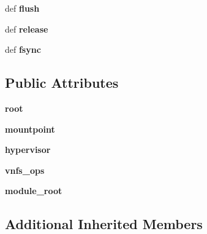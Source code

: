 \begin{DoxyCompactItemize}
\item 
\hypertarget{classnfio_1_1Nfio_a11131bfcad8345d6caac6e8a0e9edf8e}{def {\bfseries flush}}\label{classnfio_1_1Nfio_a11131bfcad8345d6caac6e8a0e9edf8e}

\item 
\hypertarget{classnfio_1_1Nfio_aa8899667347dbe1c3176f25fa29a9621}{def {\bfseries release}}\label{classnfio_1_1Nfio_aa8899667347dbe1c3176f25fa29a9621}

\item 
\hypertarget{classnfio_1_1Nfio_a9839b74eb4091fcfaf5a7d35ad20ec25}{def {\bfseries fsync}}\label{classnfio_1_1Nfio_a9839b74eb4091fcfaf5a7d35ad20ec25}

\end{DoxyCompactItemize}
\subsection*{Public Attributes}
\begin{DoxyCompactItemize}
\item 
\hypertarget{classnfio_1_1Nfio_aaebb8f6c5190c41a25e5415c56a5e6dd}{{\bfseries root}}\label{classnfio_1_1Nfio_aaebb8f6c5190c41a25e5415c56a5e6dd}

\item 
\hypertarget{classnfio_1_1Nfio_a89d8c89f78cdec45abb64091de093e8b}{{\bfseries mountpoint}}\label{classnfio_1_1Nfio_a89d8c89f78cdec45abb64091de093e8b}

\item 
\hypertarget{classnfio_1_1Nfio_a6ec5f975fcf5378e65352c2f8b4e59d4}{{\bfseries hypervisor}}\label{classnfio_1_1Nfio_a6ec5f975fcf5378e65352c2f8b4e59d4}

\item 
\hypertarget{classnfio_1_1Nfio_a844cfc22cc19b0a22059d3f4adeb3a0e}{{\bfseries vnfs\-\_\-ops}}\label{classnfio_1_1Nfio_a844cfc22cc19b0a22059d3f4adeb3a0e}

\item 
\hypertarget{classnfio_1_1Nfio_a7f13fbcef42434fff50bbe6f3f301e83}{{\bfseries module\-\_\-root}}\label{classnfio_1_1Nfio_a7f13fbcef42434fff50bbe6f3f301e83}

\end{DoxyCompactItemize}
\subsection*{Additional Inherited Members}


